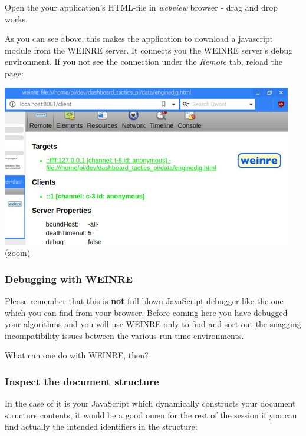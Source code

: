 \documentclass[11pt]{article}
\begin{document}
    Open the your application's HTML-file in \emph{webview} browser - drag
and drop works.

    As you can see above, this makes the application to download a
javascript module from the WEINRE server. It connects you the WEINRE
server's debug environment. If you not see the connection under the
\emph{Remote} tab, reload the page:

    \includegraphics{2019-12-25_weinre_server_connected_to_local_host_client.png}
\href{pdf/2019-12-25_weinre_server_connected_to_local_host_client.png}{(zoom)}

    \hypertarget{debugging-with-weinre}{%
\subsubsection{Debugging with WEINRE}\label{debugging-with-weinre}}

    Please remember that this is \textbf{not} full blown JavaScript debugger
like the one which you can find from your browser. Before coming here
you have debugged your algorithms and you will use WEINRE only to find
and sort out the snagging incompatibility issues between the various
run-time environments.

    What can one do with WEINRE, then?

    \hypertarget{inspect-the-document-structure}{%
\subsubsection{Inspect the document
structure}\label{inspect-the-document-structure}}

    In the case of it is your JavaScript which dynamically constructs your
document structure contents, it would be a good omen for the rest of the
session if you can find actually the intended identifiers in the
structure:
\end{document}
